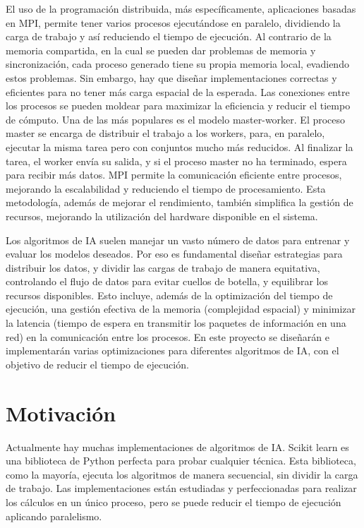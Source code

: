 El uso de la programación distribuida, más específicamente, aplicaciones basadas en MPI, permite tener varios procesos ejecutándose en paralelo, dividiendo la carga de trabajo y así reduciendo el tiempo de ejecución. Al contrario de la memoria compartida, en la cual se pueden dar problemas de memoria y sincronización, cada proceso generado tiene su propia memoria local, evadiendo estos problemas. Sin embargo, hay que diseñar implementaciones correctas y eficientes para no tener más carga espacial de la esperada. Las conexiones entre los procesos se pueden moldear para maximizar la eficiencia y reducir el tiempo de cómputo. Una de las más populares es el modelo master-worker. El proceso master se encarga de distribuir el trabajo a los workers, para, en paralelo, ejecutar la misma tarea pero con conjuntos mucho más reducidos. Al finalizar la tarea, el worker envía su salida, y si el proceso master no ha terminado, espera para recibir más datos. MPI permite la comunicación eficiente entre procesos, mejorando la escalabilidad y reduciendo el tiempo de procesamiento. Esta metodología, además de mejorar el rendimiento, también simplifica la gestión de recursos, mejorando la utilización del hardware disponible en el sistema. 

Los algoritmos de IA suelen manejar un vasto número de datos para entrenar y evaluar los modelos deseados. Por eso es fundamental diseñar estrategias para distribuir los datos, y dividir las cargas de trabajo de manera equitativa, controlando el flujo de datos para evitar cuellos de botella, y equilibrar los recursos disponibles. Esto incluye, además de la optimización del tiempo de ejecución, una gestión efectiva de la memoria (complejidad espacial) y minimizar la latencia (tiempo de espera en transmitir los paquetes de información en una red) en la comunicación entre los procesos.
En este proyecto se diseñarán e implementarán varias optimizaciones para diferentes algoritmos de IA, con el objetivo de reducir el tiempo de ejecución.





\section{Motivación}
Actualmente hay muchas implementaciones de algoritmos de IA. Scikit learn es una biblioteca de Python perfecta para probar cualquier técnica. Esta biblioteca, como la mayoría, ejecuta los algoritmos de manera secuencial, sin dividir la carga de trabajo.  Las implementaciones están estudiadas y perfeccionadas para realizar los cálculos en un único proceso, pero se puede reducir el tiempo de ejecución aplicando paralelismo. 

